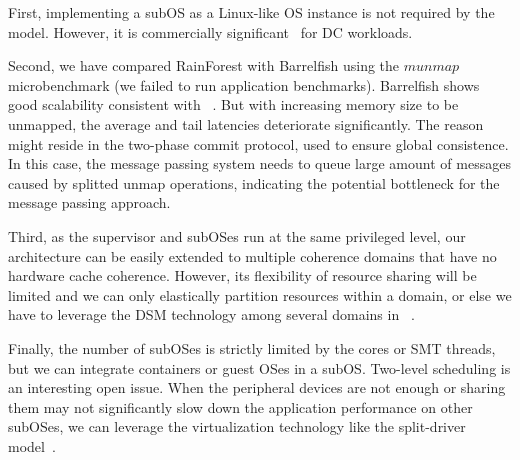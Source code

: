 \documentclass[pageno]{jpaper}
\begin{document}
First, implementing a subOS as a Linux-like OS instance is not required by the model. However, it is commercially significant~\cite{banga1999resource} for DC workloads.  


Second, we have compared RainForest with Barrelfish using the $munmap$ microbenchmark (we failed to run application benchmarks). Barrelfish shows good scalability consistent with ~\cite{ Baumann:2009:multikernel}. But with increasing memory size to be unmapped, the average and tail latencies deteriorate significantly. The reason might reside in the two-phase commit protocol, used to ensure global consistence. In this case, the message passing system needs to queue large amount of messages caused by splitted unmap operations, indicating the potential bottleneck for the message passing approach.









Third, as the supervisor and  subOSes run at the same privileged level, our architecture can be easily extended to multiple coherence domains that have no hardware cache coherence. However, its flexibility of resource sharing will be limited and we can only elastically partition resources within a domain, or else we have to leverage the DSM technology among several domains in ~\cite{lin2014k2}.









Finally, the number of subOSes is strictly limited by the cores or SMT threads, but we can  integrate containers or guest OSes in a subOS. Two-level scheduling is  an interesting open issue.
When the peripheral devices are not enough or sharing them may not significantly slow down the application performance on other subOSes, we can leverage the virtualization technology like the split-driver model~\cite{chisnall2008definitive, liu2006high}.
\end{document}
